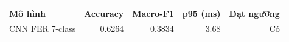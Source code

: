 \begin{tabular}{lrrrr}
\hline
Mô hình & Accuracy & Macro-F1 & p95 (ms) & Đạt ngưỡng \\
\hline
CNN FER 7-class & 0.6264 & 0.3834 & 3.68 & Có \\
\hline
\end{tabular}
